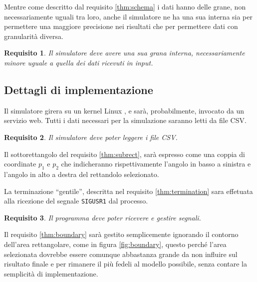 \documentclass[draft]{article}
\newcommand{\eng}[1]{\foreignlanguage{english}{#1}} %
\newtheorem{requirement}{Requisito}
\begin{document}
Mentre come descritto dal requisito \ref{thm:schema} i dati hanno delle grane,
non necessariamente uguali tra loro, anche il simulatore ne ha una sua interna
sia per permettere una maggiore precisione nei risultati che per permettere dati
con granularità diversa.

\begin{requirement}\label{thm:grain}
Il simulatore deve avere una sua grana interna, necessariamente minore uguale a
quella dei dati ricevuti in \eng{input}.
\end{requirement}

\subsection{Dettagli di implementazione}\label{sec:implementation}

Il simulatore girera su un \eng{kernel} Linux \cite{kern}, e sarà,
probabilmente, invocato da un servizio \eng{web}. Tutti i dati necessari per la
simulazione saranno letti da \eng{file} CSV.

\begin{requirement}
Il simulatore deve poter leggere i \eng{file} CSV.
\end{requirement}

Il sottorettangolo del requisito \ref{thm:subrect}, sarà espresso come una
coppia di coordinate $p_1$ e $p_2$ che indicheranno rispettivamente l'angolo in
basso a sinistra e l'angolo in alto a destra del rettandolo selezionato.

La terminazione ``gentile'', descritta nel requisito \ref{thm:termination} sara
effetuata alla ricezione del segnale \texttt{SIGUSR1} dal processo.

\begin{requirement}
Il programma deve poter ricevere e gestire segnali.
\end{requirement}

Il requisito \ref{thm:boundary} sarà gestito semplicemente ignorando il contorno
dell'area rettangolare, come in figura \ref{fig:boundary}, questo perché l'area
selezionata dovrebbe essere comunque abbastanza grande da non influire sul
risultato finale e per rimanere il più fedeli al modello possibile, senza
contare la semplicità di implementazione.
\end{document}
